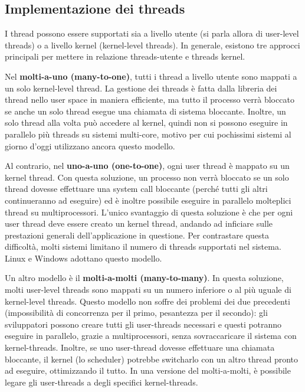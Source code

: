 \documentclass[a4paper]{article}
\begin{document}
\subsection{Implementazione dei threads}
I thread possono essere supportati sia a livello utente (si parla allora di user-level threads) o a livello kernel (kernel-level threads). In generale, esistono tre approcci principali per mettere in relazione threads-utente e threads kernel.

Nel \textbf{molti-a-uno (many-to-one)}, tutti i thread a livello utente sono mappati a un solo kernel-level thread. La gestione dei threads è fatta dalla libreria dei thread nello user space in maniera efficiente, ma tutto il processo verrà bloccato se anche un solo thread esegue una chiamata di sistema bloccante. Inoltre, un solo thread alla volta può accedere al kernel, quindi non si possono eseguire in parallelo più threads su sistemi multi-core, motivo per cui pochissimi sistemi al giorno d'oggi utilizzano ancora questo modello.

Al contrario, nel \textbf{uno-a-uno (one-to-one)}, ogni user thread è mappato su un kernel thread. Con questa soluzione, un processo non verrà bloccato se un solo thread dovesse effettuare una system call bloccante (perché tutti gli altri continueranno ad eseguire) ed è inoltre possibile eseguire in parallelo molteplici thread su multiprocessori. L'unico svantaggio di questa soluzione è che per ogni user thread deve essere creato un kernel thread, andando ad inficiare sulle prestazioni generali dell'applicazione in questione. Per contrastare questa difficoltà, molti sistemi limitano il numero di threads supportati nel sistema. Linux e Windows adottano questo modello.

Un altro modello è il \textbf{molti-a-molti (many-to-many)}. In questa soluzione, molti user-level threads sono mappati su un numero inferiore o al più uguale di kernel-level threads. Questo modello non soffre dei problemi dei due precedenti (impossibilità di concorrenza per il primo, pesantezza per il secondo): gli sviluppatori possono creare tutti gli user-threads necessari e questi potranno eseguire in parallelo, grazie a multiprocessori, senza sovraccaricare il sistema con kernel-threads. Inoltre, se uno user-thread dovesse effettuare una chiamata bloccante, il kernel (lo scheduler) potrebbe switcharlo con un altro thread pronto ad eseguire, ottimizzando il tutto. In una versione del molti-a-molti, è possibile legare gli user-threads a degli specifici kernel-threads.
\end{document}
